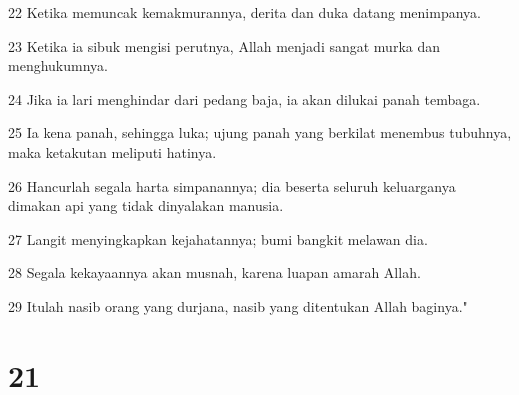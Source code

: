 \par 22 Ketika memuncak kemakmurannya, derita dan duka datang menimpanya.
\par 23 Ketika ia sibuk mengisi perutnya, Allah menjadi sangat murka dan menghukumnya.
\par 24 Jika ia lari menghindar dari pedang baja, ia akan dilukai panah tembaga.
\par 25 Ia kena panah, sehingga luka; ujung panah yang berkilat menembus tubuhnya, maka ketakutan meliputi hatinya.
\par 26 Hancurlah segala harta simpanannya; dia beserta seluruh keluarganya dimakan api yang tidak dinyalakan manusia.
\par 27 Langit menyingkapkan kejahatannya; bumi bangkit melawan dia.
\par 28 Segala kekayaannya akan musnah, karena luapan amarah Allah.
\par 29 Itulah nasib orang yang durjana, nasib yang ditentukan Allah baginya."

\chapter{21}

